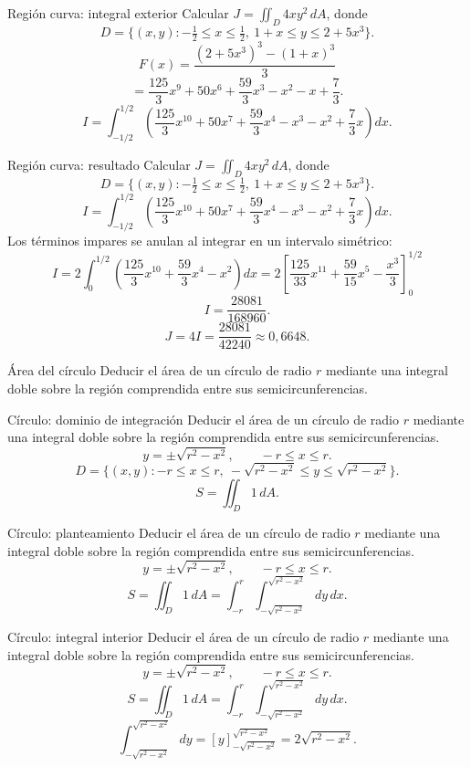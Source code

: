 \documentclass[original_version/main.tex]{subfiles}
\begin{document}
\begin{frame}{Región curva: integral exterior}
\small Calcular $J=\iint_D4xy^2\,dA$, donde\[D=\{(x,y):-\tfrac12\le x\le\tfrac12,\ 1+x\le y\le2+5x^3\}.\]\[F(x)=\frac{(2+5x^3)^3-(1+x)^3}{3}\]\[=\frac{125}{3}x^9+50x^6+\frac{59}{3}x^3-x^2-x+\frac73.\]\[I=\int_{-1/2}^{1/2}\left(\frac{125}{3}x^{10}+50x^7+\frac{59}{3}x^4-x^3-x^2+\frac73x\right)dx.\]
\end{frame}

\begin{frame}{Región curva: resultado}
\small Calcular $J=\iint_D4xy^2\,dA$, donde\[D=\{(x,y):-\tfrac12\le x\le\tfrac12,\ 1+x\le y\le2+5x^3\}.\]\[I=\int_{-1/2}^{1/2}\left(\frac{125}{3}x^{10}+50x^7+\frac{59}{3}x^4-x^3-x^2+\frac73x\right)dx.\]Los términos impares se anulan al integrar en un intervalo simétrico:\[I=2\int_0^{1/2}\left(\frac{125}{3}x^{10}+\frac{59}{3}x^4-x^2\right)dx=2\left[\frac{125}{33}x^{11}+\frac{59}{15}x^5-\frac{x^3}{3}\right]_0^{1/2}\]
\[I=\frac{28081}{168960}.\]\[\boxed{J=4I=\frac{28081}{42240}\approx0{,}6648.}\]
\end{frame}

\begin{frame}{Área del círculo}
Deducir el área de un círculo de radio $r$ mediante una integral doble sobre la región comprendida entre sus semicircunferencias.
\end{frame}

\begin{frame}{Círculo: dominio de integración}
Deducir el área de un círculo de radio $r$ mediante una integral doble sobre la región comprendida entre sus semicircunferencias.\[y=\pm\sqrt{r^2-x^2},\qquad -r\le x\le r.\]\[D=\{(x,y):-r\le x\le r,\ -\sqrt{r^2-x^2}\le y\le\sqrt{r^2-x^2}\}.\]\[S=\iint_D1\,dA.\]
\end{frame}

\begin{frame}{Círculo: planteamiento}
Deducir el área de un círculo de radio $r$ mediante una integral doble sobre la región comprendida entre sus semicircunferencias.\[y=\pm\sqrt{r^2-x^2},\qquad -r\le x\le r.\]\[S=\iint_D1\,dA=\int_{-r}^r\int_{-\sqrt{r^2-x^2}}^{\sqrt{r^2-x^2}}dy\,dx.\]
\end{frame}

\begin{frame}{Círculo: integral interior}
\small Deducir el área de un círculo de radio $r$ mediante una integral doble sobre la región comprendida entre sus semicircunferencias.\[y=\pm\sqrt{r^2-x^2},\qquad -r\le x\le r.\]\[S=\iint_D1\,dA=\int_{-r}^r\int_{-\sqrt{r^2-x^2}}^{\sqrt{r^2-x^2}}dy\,dx.\]\[\int_{-\sqrt{r^2-x^2}}^{\sqrt{r^2-x^2}}dy=[y]_{-\sqrt{r^2-x^2}}^{\sqrt{r^2-x^2}}=2\sqrt{r^2-x^2}.\]
\end{frame}
\end{document}
